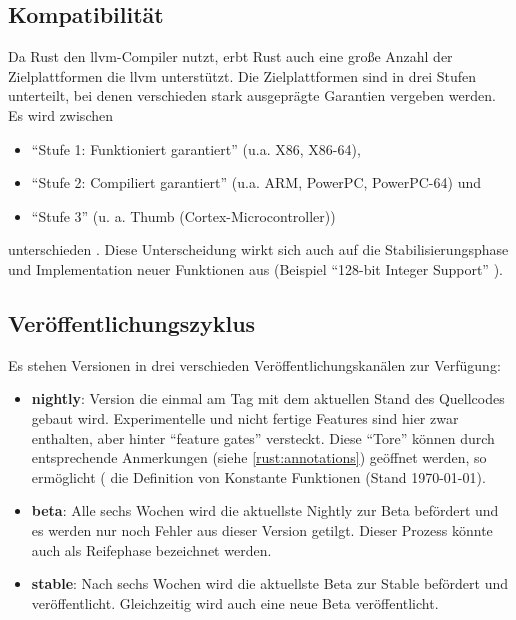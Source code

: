 \subsection{Kompatibilität}
Da Rust den \gls{llvm}-Compiler nutzt, erbt Rust auch eine große Anzahl der Zielplattformen die \gls{llvm} unterstützt.
Die Zielplattformen sind in drei Stufen unterteilt, bei denen verschieden stark ausgeprägte Garantien vergeben werden. Es wird zwischen
\begin{itemize}
	\item \enquote{Stufe 1: Funktioniert garantiert} (u.a. X86, X86-64),
	\item \enquote{Stufe 2: Compiliert garantiert} (u.a. ARM, PowerPC, PowerPC-64) und
	\item \enquote{Stufe 3} (u. a. Thumb (Cortex-Microcontroller))
\end{itemize}
unterschieden \cite{rust:platform_support}.
Diese Unterscheidung wirkt sich auch auf die Stabilisierungsphase und Implementation neuer Funktionen aus (Beispiel \enquote{128-bit Integer Support} \cite{rust:github:128bit_integer}).

\subsection{Veröffentlichungszyklus}
\label{rust:feature_gates}

Es stehen Versionen in drei verschieden Veröffentlichungskanälen zur Verfügung:
\begin{itemize}
	\item \textbf{nightly}:
	Version die einmal am Tag mit dem aktuellen Stand des Quellcodes gebaut wird.
	Experimentelle und nicht fertige Features sind hier zwar enthalten, aber hinter \enquote{feature gates} versteckt.
	Diese \enquote{Tore} können durch entsprechende Anmerkungen (siehe \autoref{rust:annotations}) geöffnet werden, so ermöglicht ( die Definition von Konstante Funktionen (Stand \today).
	
	\item \textbf{beta}: Alle sechs Wochen wird die aktuellste Nightly zur Beta befördert und es werden nur noch Fehler aus dieser Version getilgt.
	Dieser Prozess könnte auch als Reifephase bezeichnet werden.
	\item \textbf{stable}: Nach sechs Wochen wird die aktuellste Beta zur Stable befördert und veröffentlicht.
	Gleichzeitig wird auch eine neue Beta veröffentlicht.
\end{itemize}

